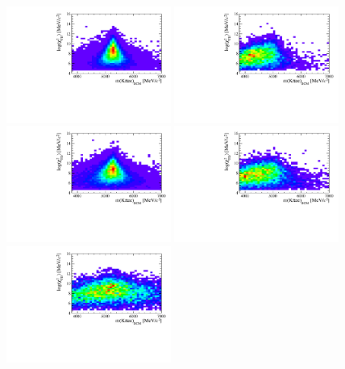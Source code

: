 \begin{figure}[t!]
\centering
\includegraphics[width=0.48\textwidth]{RKst/figs/HOP/HOP_sig_low.pdf}
\includegraphics[width=0.48\textwidth]{RKst/figs/HOP/HOP_bkg_low.pdf}
\includegraphics[width=0.48\textwidth]{RKst/figs/HOP/HOP_sig_central.pdf}
\includegraphics[width=0.48\textwidth]{RKst/figs/HOP/HOP_bkg_central.pdf}
\includegraphics[width=0.48\textwidth]{RKst/figs/HOP/HOP_sig_high.pdf}

\end{figure}
